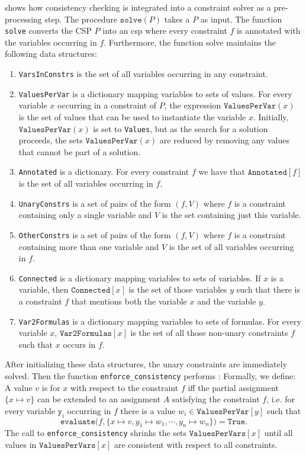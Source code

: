   shows how consistency checking is
integrated into a constraint solver as a pre-processing step.
The procedure $\texttt{solve}(P)$ takes a 
$P$ as input.  The function \texttt{solve} converts the CSP $P$ into an  \ac{csp} where every
constraint $f$ is annotated with the variables occurring in $f$.  Furthermore, the function solve maintains the
following data structures: 
\begin{enumerate}
\item \texttt{VarsInConstrs} is the set of all variables occurring in any constraint.
\item \texttt{ValuesPerVar} is a dictionary mapping variables to sets of values.  For every variable $x$
      occurring in a constraint of $P$, the expression $\texttt{ValuesPerVar}(x)$ is the set of values that can
      be used to instantiate the variable $x$.  Initially, $\texttt{ValuesPerVar}(x)$ is set to
      \texttt{Values}, but as the search for a solution proceeds, the sets $\texttt{ValuesPerVar}(x)$ are
      reduced by removing any values that  cannot be part of a solution. 
\item \texttt{Annotated} is a dictionary.  For every constraint $f$ we have that $\texttt{Annotated}[f]$ is the
  set of all variables occurring in $f$. 
\item \texttt{UnaryConstrs} is a set of pairs of the form $(f, V)$ where $f$ is a constraint containing only a
      single variable and $V$ is the set containing just this variable. 
\item \texttt{OtherConstrs} is a set of pairs of the form $(f, V)$ where $f$ is a constraint containing more
      than one variable and $V$ is the set of all variables occurring in $f$. 
\item \texttt{Connected} is a dictionary mapping variables to sets of variables.  If $x$ is a variable, then
      $\texttt{Connected}[x]$ is the set of those variables $y$ such that there is a constraint $f$ that
      mentions both the variable $x$ and the variable $y$. 
\item \texttt{Var2Formulas} is a dictionary mapping variables to sets of formulas.  For every variable $x$,
      $\texttt{Var2Formulas}[x]$ is the set of all those non-unary constraints $f$ such that $x$ occurs in $f$. 
\end{enumerate}
After initializing these data structures, the unary constraints are immediately solved.  Then the
function \texttt{enforce\_consistency} performs  :  
Formally, we define: A value $v$ is  for $x$ with respect to the constraint $f$
iff the partial assignment $\{ x \mapsto v \}$ can be extended to an assignment $A$ satisfying the constraint $f$,
i.e. for every variable $\texttt{y}_i$ occurring in $f$ there is a value $w_i \in \texttt{ValuesPerVar}[y]$ such that  
$$ \texttt{evaluate}\bigl(f, \{ x \mapsto v, y_1 \mapsto w_1, \cdots, y_n \mapsto w_n\}\bigr) = \texttt{True}. $$
The call to \texttt{enforce\_consistency} shrinks the sets $\texttt{ValuesPerVars}[x]$ until all values in
$\texttt{ValuesPerVars}[x]$ are consistent with respect to all constraints.

